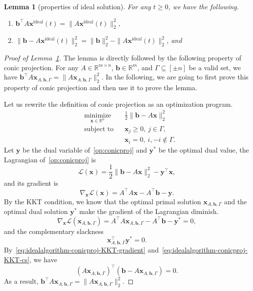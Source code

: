\documentclass[11pt]{article}
\newtheorem{lemma}{Lemma}[section]
\theoremstyle{remark}
\theoremstyle{definition}
\newcommand{\by}{\mathbf{y}}
\newcommand{\bx}{\mathbf{x}}
\newcommand{\bb}{\mathbf{b}}
\newcommand{\ATA}{A^\top A}
\newcommand{\R}{{\mathbb R}} %
\begin{document}
\begin{lemma}[properties of ideal solution]\label{lem:ideal solution properties}
	For any $t\geq0$, we have the following.
	\begin{enumerate}
		\item $\bb^\top A\bx^{\text{ideal}}(t)=\|A\bx^{\text{ideal}}(t)\|_2^2$,
		\item $\|\bb-A\bx^{\text{ideal}}(t)\|_2^2=\|\bb\|_2^2-\|A\bx^{\text{ideal}}(t)\|_2^2$, and
	\end{enumerate}
\end{lemma}
\begin{proof}[Proof of Lemma~\ref{lem:ideal solution properties}]
	The lemma is directly followed by the following property of conic projection. For any $A\in\R^{m\times n}$, $\bb\in\R^m$, and $\Gamma\subseteq[\pm n]$ be a valid set, we have $\bb^\top A\bx_{A,\bb,\Gamma}=\|A\bx_{A,\bb,\Gamma}\|_2^2$. In the following, we are going to first prove this property of conic projection and then use it to prove the lemma.
	
	Let us rewrite the definition of conic projection as an optimization program.
	\begin{equation}\label{op:conicproj}
	\begin{aligned}
	& \underset{\bx\in\R^n}{\text{minimize}}
	& & \frac{1}{2}\|\bb-A\bx\|_2^2 \\
	& \text{subject to}
	& & \bx_j\geq0,\ j\in\Gamma,\\
	& & & \bx_i=0,\ i,-i\notin\Gamma.
	\end{aligned}
	\end{equation}
	Let $\by$ be the dual variable of~\eqref{op:conicproj} and $\by^*$ be the optimal dual value, the Lagrangian of~\eqref{op:conicproj} is
	\begin{equation*}
	\mathcal{L}(\bx) = \frac{1}{2}\|\bb-A\bx\|_2^2-\by^\top\bx,
	\end{equation*}
	and its gradient is
	\begin{equation*}
	\nabla_{\bx}\mathcal{L}(\bx) = \ATA\bx - A^\top\bb - \by.
	\end{equation*}
	By the KKT condition, we know that the optimal primal solution $\bx_{A,\bb,\Gamma}$ and the optimal dual solution $\by^*$ make the gradient of the Lagrangian diminish.
	\begin{equation}\label{eq:idealalgorithm-conicproj-KKT-gradient}
	\nabla_{\bx}\mathcal{L}(\bx_{A,\bb,\Gamma}) = \ATA\bx_{A,\bb,\Gamma} - A^\top\bb - \by^*=0,
	\end{equation}
	and the complementary slackness
	\begin{equation}\label{eq:idealalgorithm-conicproj-KKT-cs}
	\bx_{A,\bb,\Gamma}^\top\by^*=0.
	\end{equation}
	By~\eqref{eq:idealalgorithm-conicproj-KKT-gradient} and~\eqref{eq:idealalgorithm-conicproj-KKT-cs}, we have
	\begin{equation*}\label{eq:idealalgorithm-conicproj-orthogonal}
	(A\bx_{A,\bb,\Gamma})^\top(\bb-A\bx_{A,\bb,\Gamma})=0.
	\end{equation*}
	As a result, $\bb^\top A\bx_{A,\bb,\Gamma}=\|A\bx_{A,\bb,\Gamma}\|_2^2$.
	

\end{proof}
\end{document}
